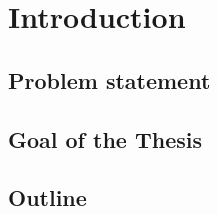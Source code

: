 \chapter{Introduction}
\label{chap:introduction}

\section{Problem statement}




\section{Goal of the Thesis}




\section{Outline}















